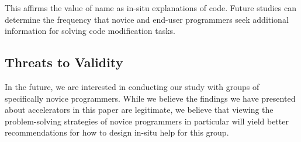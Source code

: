 This affirms the value of \gls{name} as in-situ explanations of code.
Future studies can determine the frequency that novice and end-user programmers seek additional information for solving code modification tasks.

\subsection{Threats to Validity}

In the future, we are interested in conducting our study with groups of specifically novice programmers.
While we believe the findings we have presented about accelerators in this paper are legitimate, we believe that viewing the problem-solving strategies of novice programmers in particular will yield better recommendations for how to design in-situ help for this group.
